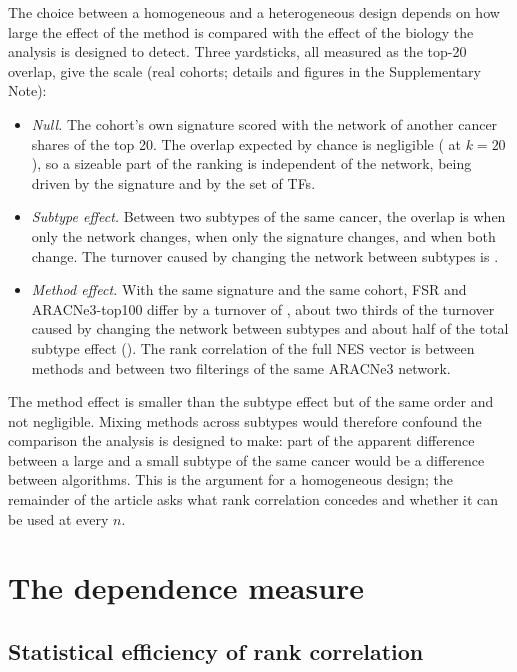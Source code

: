 \documentclass[11pt,a4paper]{article}
\theoremstyle{plain}
\theoremstyle{remark}
\newcommand{\FSR}{FSR}
\begin{document}
The choice between a homogeneous and a heterogeneous design depends on how large the effect of the method is compared with the
effect of the biology the analysis is designed to detect. Three yardsticks, all measured as the top-20 overlap, give the scale
(real cohorts; details and figures in the Supplementary Note):
\begin{itemize}
  \item \emph{Null.} The cohort's own signature scored with the network of another cancer shares \KnullmediantopTwoZero{} of the
  top 20. The overlap expected by chance is negligible (\KksweepchancekTwoZero{} at $k=20$), so a sizeable part of the ranking is independent of the
  network, being driven by the signature and by the set of TFs.
  \item \emph{Subtype effect.} Between two subtypes of the same cancer, the overlap is \KwithinnetmediantopTwoZero{} when only the network changes,
  \KwithinsigmediantopTwoZero{} when only the signature changes, and \KwithincancermediantopTwoZero{} when both change. The turnover caused by changing
  the network between subtypes is \KnetworkeffectbetweensubtypestopTwoZeroturnover.
  \item \emph{Method effect.} With the same signature and the same cohort, \FSR{} and ARACNe3-top100 differ by a turnover of
  \KmethodeffecttopTwoZeroturnover, about two thirds of the turnover caused by changing the network between subtypes and about half of the total
  subtype effect (\KsubtypeeffecttopTwoZeroturnover). The rank correlation of the full NES vector is \KAvsBmedianrho{}
  between methods and \KBvsCmedianrho{} between two filterings of the same ARACNe3 network.
\end{itemize}
The method effect is smaller than the subtype effect but of the same order and not negligible. Mixing methods across subtypes
would therefore confound the comparison the analysis is designed to make: part of the apparent difference between a large and a
small subtype of the same cancer would be a difference between algorithms. This is the argument for a homogeneous design; the
remainder of the article asks what rank correlation concedes and whether it can be used at every $n$.

\section{The dependence measure}

\subsection{Statistical efficiency of rank correlation}
\label{sec:efficiency}
\end{document}
